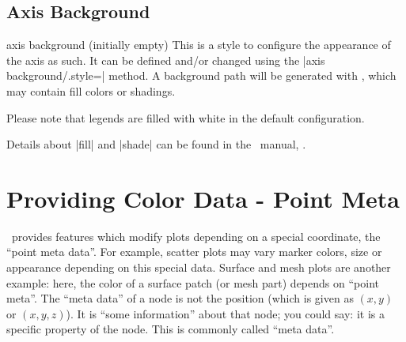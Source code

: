 \subsection{Axis Background}
\begin{pgfplotskey}{axis background (initially empty)}
	This is a style to configure the appearance of the axis as such. It can be defined and/or changed using the |axis background/.style=| method. A background path will be generated with , which may contain fill colors or shadings.

\pgfplotsexpensiveexample
\begin{codeexample}[]
\end{codeexample}

	Please note that legends are filled with white in the default configuration.
\begin{codeexample}[]
\end{codeexample}
	Details about |fill| and |shade| can be found in the \Tikz\ manual, \cite{tikz}.
\end{pgfplotskey}


\section{Providing Color Data - Point Meta}
\label{pgfplots:point:meta}
\PGFPlots\ provides features which modify plots depending on a special coordinate, the ``point meta data''. For example, scatter plots may vary marker colors, size or appearance depending on this special data. Surface and mesh plots are another example: here, the color of a surface patch (or mesh part) depends on ``point meta''. The ``meta data'' of a node is not the position (which is given as $(x,y)$ or $(x,y,z)$). It is ``some information'' about that node; you could say: it is a specific property of the node. This is commonly called ``meta data''. 

